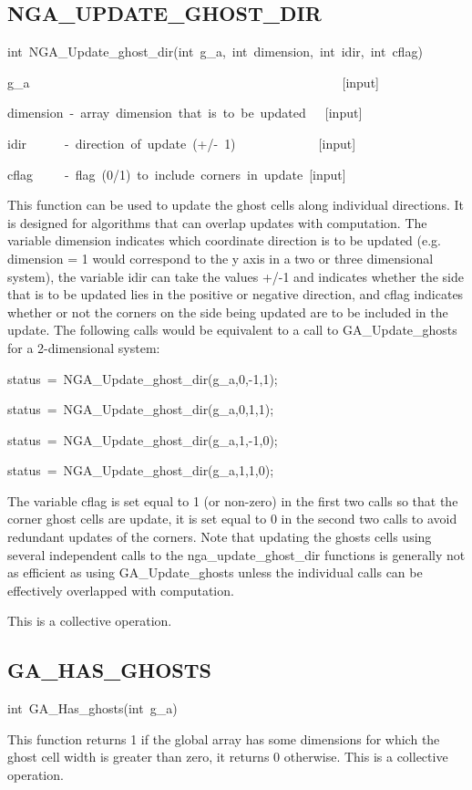 \subsection*{\label{sub:NGA_UPDATE_GHOST_DIR}NGA\_UPDATE\_GHOST\_DIR}
\begin{lyxcode}
int~NGA\_Update\_ghost\_dir(int~g\_a,~int~dimension,~int~idir,~int~cflag)



g\_a~~~~~~~~~~~~~~~~~~~~~~~~~~~~~~~~~~~~~~~~~~~~~~~~~{[}input{]}~

dimension~-~array~dimension~that~is~to~be~updated~~~{[}input{]}~

idir~~~~~~-~direction~of~update~(+/-~1)~~~~~~~~~~~~~{[}input{]}~

cflag~~~~~-~flag~(0/1)~to~include~corners~in~update~{[}input{]}
\end{lyxcode}
This function can be used to update the ghost cells along individual
directions. It is designed for algorithms that can overlap updates
with computation. The variable dimension indicates which coordinate
direction is to be updated (e.g. dimension = 1 would correspond to
the y axis in a two or three dimensional system), the variable idir
can take the values +/-1 and indicates whether the side that is to
be updated lies in the positive or negative direction, and cflag indicates
whether or not the corners on the side being updated are to be included
in the update. The following calls would be equivalent to a call to
GA\_Update\_ghosts for a 2-dimensional system: 
\begin{lyxcode}
status~=~NGA\_Update\_ghost\_dir(g\_a,0,-1,1);~

status~=~NGA\_Update\_ghost\_dir(g\_a,0,1,1);~

status~=~NGA\_Update\_ghost\_dir(g\_a,1,-1,0);~

status~=~NGA\_Update\_ghost\_dir(g\_a,1,1,0);
\end{lyxcode}
The variable cflag is set equal to 1 (or non-zero) in the first two
calls so that the corner ghost cells are update, it is set equal to
0 in the second two calls to avoid redundant updates of the corners.
Note that updating the ghosts cells using several independent calls
to the nga\_update\_ghost\_dir functions is generally not as efficient
as using GA\_Update\_ghosts unless the individual calls can be effectively
overlapped with computation.

This is a collective operation. 


\subsection*{\label{sub:GA_HAS_GHOSTS}GA\_HAS\_GHOSTS}
\begin{lyxcode}
int~GA\_Has\_ghosts(int~g\_a)
\end{lyxcode}
This function returns 1 if the global array has some dimensions for
which the ghost cell width is greater than zero, it returns 0 otherwise.
This is a collective operation. 


